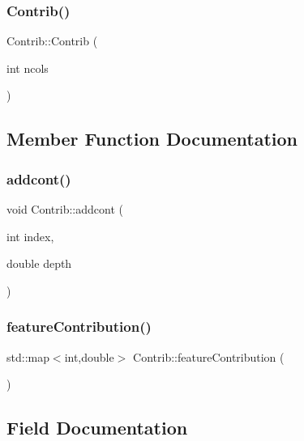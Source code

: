 \subsubsection{\texorpdfstring{Contrib()}{Contrib()}}
{\footnotesize\ttfamily Contrib\+::\+Contrib (\begin{DoxyParamCaption}\item[{int}]{ncols }\end{DoxyParamCaption})\hspace{0.3cm}{\ttfamily [inline]}}



\subsection{Member Function Documentation}
\mbox{\label{structContrib_a03900805a2d1b5452f62d347511bec90}} 
\subsubsection{\texorpdfstring{addcont()}{addcont()}}
{\footnotesize\ttfamily void Contrib\+::addcont (\begin{DoxyParamCaption}\item[{int}]{index,  }\item[{double}]{depth }\end{DoxyParamCaption})\hspace{0.3cm}{\ttfamily [inline]}}

\mbox{\label{structContrib_ab3a6d22d834b8fa669b436672d21dd0b}} 
\subsubsection{\texorpdfstring{feature\+Contribution()}{featureContribution()}}
{\footnotesize\ttfamily std\+::map$<$int,double$>$ Contrib\+::feature\+Contribution (\begin{DoxyParamCaption}{ }\end{DoxyParamCaption})\hspace{0.3cm}{\ttfamily [inline]}}



\subsection{Field Documentation}
\mbox{\label{structContrib_adfd8e1bb6847746d18bdeced40876b59}} 
